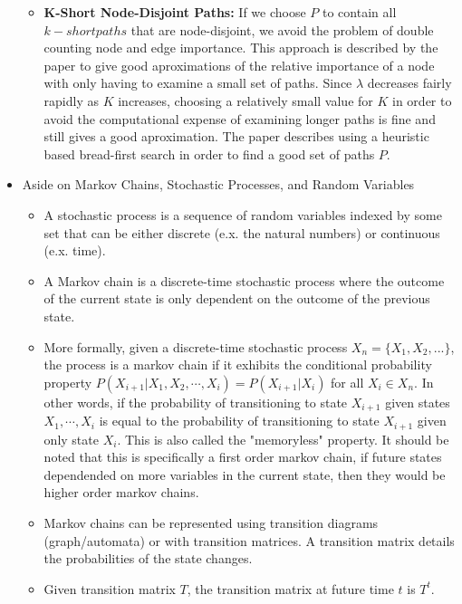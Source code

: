 \documentclass[a4paper]{article}
\begin{document}
\begin{itemize}
\begin{itemize}
\item \textbf{K-Short Node-Disjoint Paths:} If we choose $P$ to contain all $k-short paths$ that are node-disjoint, we avoid the problem of double counting node and edge importance. This approach is described by the paper to give good aproximations of the relative importance of a node with only having to examine a small set of paths. Since $\lambda$ decreases fairly rapidly as $K$ increases, choosing a relatively small value for $K$ in order to avoid the computational expense of examining longer paths is fine and still gives a good aproximation. The paper describes using a heuristic based bread-first search in order to find a good set of paths $P$. 
\end{itemize}

\item Aside on Markov Chains, Stochastic Processes, and Random Variables
\begin{itemize}
\item A stochastic process is a sequence of random variables indexed by some set that can be either discrete (e.x. the natural numbers) or continuous (e.x. time).

\item A Markov chain is a discrete-time stochastic process where the outcome of the current state is only dependent on the outcome of the previous state.

\item More formally, given a discrete-time stochastic process $X_n = \{X_1, X_2, ...\}$, the process is a markov chain if it exhibits the conditional probability property $P(X_{i+1} | X_1, X_2, \cdots
, X_i) = P(X_{i+1} | X_i)$ for all $X_i \in X_n$. In other words, if the probability of transitioning to state $X_{i+1}$ given states $X_1, \cdots, X_i$ is equal to the probability of transitioning to state $X_{i+1}$ given only state $X_i$. This is also called the "memoryless" property. It should be noted that this is specifically a first order markov chain, if future states dependended on more variables in the current state, then they would be higher order markov chains.

\item Markov chains can be represented using transition diagrams (graph/automata) or with transition matrices. A transition matrix details the probabilities of the state changes.

\item Given transition matrix $T$, the transition matrix at future time $t$ is $T^t$.


\end{itemize}
\end{itemize}
\end{document}
